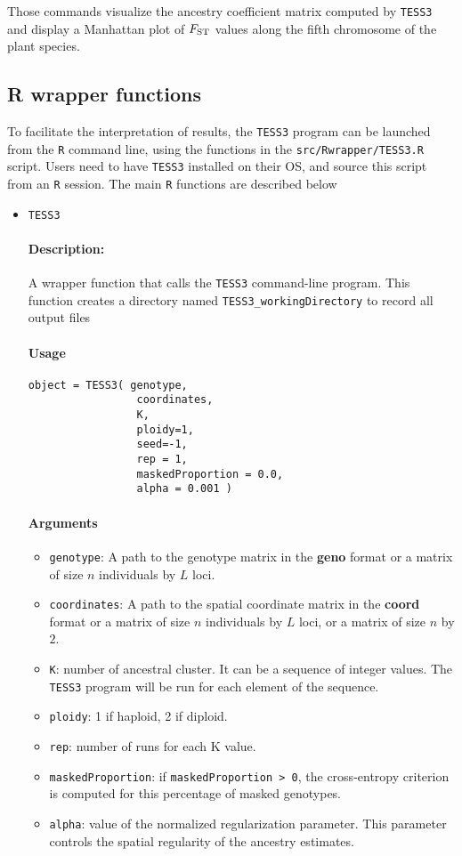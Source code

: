 \documentclass[10pt,a4paper]{article}
\begin{document}
Those commands visualize the ancestry coefficient matrix computed by {\tt TESS3} and display a Manhattan plot of $F_{\rm ST}$ values along the fifth chromosome of the plant species.




\subsection{R wrapper functions}
To facilitate the interpretation of results, the {\tt TESS3} program can be launched from the {\tt R} command line, using the functions in the  \verb|src/Rwrapper/TESS3.R| script. Users need to have {\tt TESS3} installed on their OS, and source this script from an {\tt R} session. The main {\tt R} functions are described below

\begin{itemize}

\item \verb|TESS3|

\paragraph{Description:}
A wrapper function that calls the {\tt TESS3} command-line program. This function creates a directory named \verb|TESS3_workingDirectory| to record all output files
\paragraph{Usage}
\begin{Verbatim}
object = TESS3( genotype,
                 coordinates,
                 K,
                 ploidy=1,
                 seed=-1, 
                 rep = 1, 
                 maskedProportion = 0.0, 
                 alpha = 0.001 )
\end{Verbatim}
\paragraph{Arguments}
\begin{itemize}
\item \verb|genotype|:  A path to the genotype matrix in the {\bf geno} format or a matrix of size $n$ individuals by $L$ loci. 
\item \verb|coordinates|:  A path to the spatial coordinate matrix in the {\bf coord} format or a matrix of size $n$ individuals by $L$ loci, or a matrix of size $n$ by $2$. 
\item \verb|K|: number of ancestral cluster. It can be a sequence of integer values. The {\tt TESS3} program will be run for each element of the sequence.
\item \verb|ploidy|: 1 if haploid, 2 if diploid.
\item \verb|rep|: number of runs for each K value.
\item \verb|maskedProportion|: if \verb|maskedProportion > 0|, the cross-entropy criterion is computed for this percentage of masked genotypes.
\item \verb|alpha|: value of the normalized regularization parameter. This parameter controls the spatial regularity of the ancestry estimates.
\end{itemize}


\end{itemize}
\end{document}
